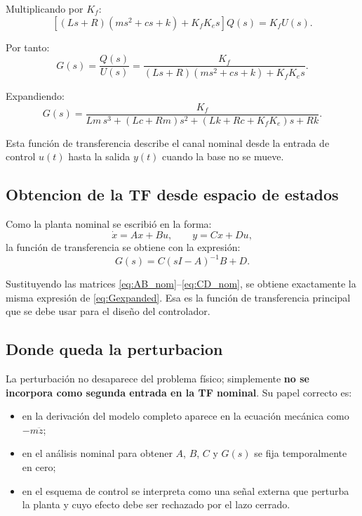 \documentclass[11pt]{article}
\begin{document}
Multiplicando por $K_f$:
\[
\left[(Ls+R)(ms^2+cs+k)+K_fK_e s\right]Q(s)=K_fU(s).
\]

Por tanto:
\begin{equation}
G(s)=\frac{Q(s)}{U(s)}
=
\frac{K_f}{(Ls+R)(ms^2+cs+k)+K_fK_e s}.
\label{eq:G}
\end{equation}

Expandiendo:
\begin{equation}
G(s)=
\frac{K_f}
{Lm\,s^3 + (Lc+Rm)s^2 + (Lk+Rc+K_fK_e)s + Rk}.
\label{eq:Gexpanded}
\end{equation}

Esta funci\'on de transferencia describe el canal nominal desde la entrada de control $u(t)$ hasta la salida $y(t)$ cuando la base no se mueve.

\subsection{Obtencion de la TF desde espacio de estados}

Como la planta nominal se escribi\'o en la forma:
\[
\dot x = Ax+Bu,\qquad y=Cx+Du,
\]
la funci\'on de transferencia se obtiene con la expresi\'on:
\begin{equation}
G(s)=C(sI-A)^{-1}B+D.
\label{eq:ss2tf}
\end{equation}

Sustituyendo las matrices \eqref{eq:AB_nom}--\eqref{eq:CD_nom}, se obtiene exactamente la misma expresi\'on de \eqref{eq:Gexpanded}. Esa es la funci\'on de transferencia principal que se debe usar para el dise\~no del controlador.

\subsection{Donde queda la perturbacion}

La perturbaci\'on no desaparece del problema f\'isico; simplemente \textbf{no se incorpora como segunda entrada en la TF nominal}. Su papel correcto es:

\begin{itemize}[leftmargin=1.2cm]
\item en la derivaci\'on del modelo completo aparece en la ecuaci\'on mec\'anica como $-m\ddot z$;
\item en el an\'alisis nominal para obtener $A$, $B$, $C$ y $G(s)$ se fija temporalmente en cero;
\item en el esquema de control se interpreta como una se\~nal externa que perturba la planta y cuyo efecto debe ser rechazado por el lazo cerrado.
\end{itemize}
\end{document}
